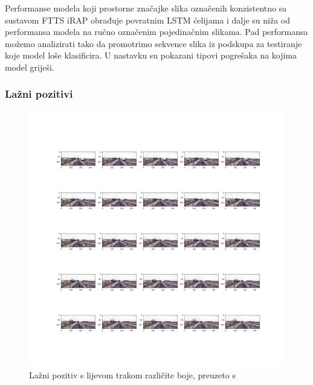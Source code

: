\documentclass[times, utf8, diplomski, numeric]{fer}
\begin{document}
Performanse modela koji prostorne značajke slika označenih konzistentno sa sustavom FTTS iRAP obrađuje povratnim LSTM ćelijama i dalje su niža od performansa modela na ručno označenim pojedinačnim slikama.
Pad performansa možemo analizirati tako da promotrimo sekvence slika iz podskupa za testiranje koje model loše klasificira. 
U nastavku su pokazani tipovi pogrešaka na kojima model griješi.

\subsubsection{Lažni pozitivi }
\begin{figure}[H]
\centering
\includegraphics[scale=0.3]{images/fp_1.png}
\caption{Lažni pozitiv s lijevom trakom različite boje, preuzeto s \citep{url:ftts_irap}}
\label{img:fp_1}
\end{figure}
\end{document}
